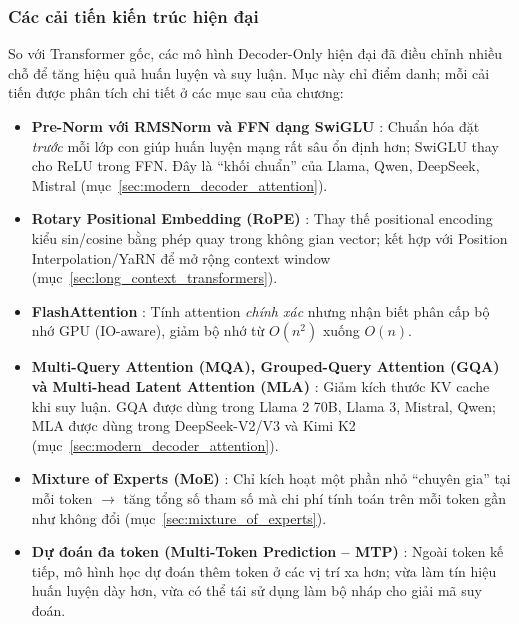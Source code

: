 \begin{center}
	\label{fig:gpt_clm}
\end{center}
\subsubsection{Các cải tiến kiến trúc hiện đại}
So với Transformer gốc, các mô hình Decoder-Only hiện đại đã điều chỉnh nhiều chỗ để tăng hiệu quả huấn luyện và suy luận. Mục này chỉ điểm danh; mỗi cải tiến được phân tích chi tiết ở các mục sau của chương:
\begin{itemize}
	\item \textbf{Pre-Norm với RMSNorm và FFN dạng SwiGLU} \cite{zhang2019rmsnorm, shazeer2020glu}:
	Chuẩn hóa đặt \emph{trước} mỗi lớp con giúp huấn luyện mạng rất sâu ổn định hơn; SwiGLU thay cho ReLU trong FFN. Đây là “khối chuẩn” của Llama, Qwen, DeepSeek, Mistral (mục~\ref{sec:modern_decoder_attention}).
	\item \textbf{Rotary Positional Embedding (RoPE)} \cite{su2021rope}:
	Thay thế positional encoding kiểu sin/cosine bằng phép quay trong không gian vector; kết hợp với Position Interpolation/YaRN để mở rộng context window (mục~\ref{sec:long_context_transformers}).
	\item \textbf{FlashAttention} \cite{dao2022flashattention, dao2024flashattention2}:
	Tính attention \emph{chính xác} nhưng nhận biết phân cấp bộ nhớ GPU (IO-aware), giảm bộ nhớ từ $O(n^2)$ xuống $O(n)$.
	\item \textbf{Multi-Query Attention (MQA), Grouped-Query Attention (GQA) và Multi-head Latent Attention (MLA)} \cite{shazeer2019fast, ainslie2023gqa, deepseekai2024v2}:
	Giảm kích thước KV cache khi suy luận. GQA được dùng trong Llama 2 70B, Llama 3, Mistral, Qwen; MLA được dùng trong DeepSeek-V2/V3 và Kimi K2 (mục~\ref{sec:modern_decoder_attention}).
	\item \textbf{Mixture of Experts (MoE)} \cite{shazeer2017outrageously, fedus2022switch, jiang2024mixtral, dai2024deepseekmoe}:
	Chỉ kích hoạt một phần nhỏ “chuyên gia” tại mỗi token $\rightarrow$ tăng tổng số tham số mà chi phí tính toán trên mỗi token gần như không đổi (mục~\ref{sec:mixture_of_experts}).
	\item \textbf{Dự đoán đa token (Multi-Token Prediction -- MTP)} \cite{gloeckle2024mtp, deepseekai2024v3}:
	Ngoài token kế tiếp, mô hình học dự đoán thêm token ở các vị trí xa hơn; vừa làm tín hiệu huấn luyện dày hơn, vừa có thể tái sử dụng làm bộ nháp cho giải mã suy đoán.
\end{itemize}

